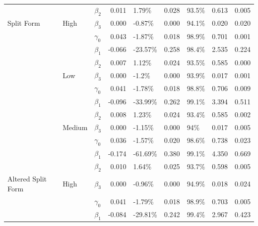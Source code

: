 \documentclass{svjour3}\usepackage[]{graphicx}\usepackage[]{color}
\newenvironment{knitrout}{}{} %
\begin{document}
\begin{knitrout}
\begin{table}[!h]
{\begin{tabular}[t]{l|l|l|r|l|r|l|r|r}
 &  & $\beta_2$ & 0.011 & 1.79\% & 0.028 & 93.5\% & 0.613 & 0.005\\

\multirow{-12}{*}{\raggedright\arraybackslash Split Form} & \multirow{-4}{*}{\raggedright\arraybackslash High} & $\beta_3$ & 0.000 & -0.87\% & 0.000 & 94.1\% & 0.020 & 0.020\\
\cline{1-9}
 &  & $\gamma_0$ & 0.043 & -1.87\% & 0.018 & 98.9\% & 0.701 & 0.001\\

 &  & $\beta_1$ & -0.066 & -23.57\% & 0.258 & 98.4\% & 2.535 & 0.224\\

 &  & $\beta_2$ & 0.007 & 1.12\% & 0.024 & 93.5\% & 0.585 & 0.000\\

 & \multirow{-4}{*}{\raggedright\arraybackslash Low} & $\beta_3$ & 0.000 & -1.2\% & 0.000 & 93.9\% & 0.017 & 0.001\\

 &  & $\gamma_0$ & 0.041 & -1.78\% & 0.018 & 98.8\% & 0.706 & 0.009\\

 &  & $\beta_1$ & -0.096 & -33.99\% & 0.262 & 99.1\% & 3.394 & 0.511\\

 &  & $\beta_2$ & 0.008 & 1.23\% & 0.024 & 93.4\% & 0.585 & 0.002\\

 & \multirow{-4}{*}{\raggedright\arraybackslash Medium} & $\beta_3$ & 0.000 & -1.15\% & 0.000 & 94\% & 0.017 & 0.005\\

 &  & $\gamma_0$ & 0.036 & -1.57\% & 0.020 & 98.6\% & 0.738 & 0.023\\

 &  & $\beta_1$ & -0.174 & -61.69\% & 0.380 & 99.1\% & 4.350 & 0.669\\

 &  & $\beta_2$ & 0.010 & 1.64\% & 0.025 & 93.7\% & 0.598 & 0.005\\

\multirow{-12}{*}{\raggedright\arraybackslash Altered Split Form} & \multirow{-4}{*}{\raggedright\arraybackslash High} & $\beta_3$ & 0.000 & -0.96\% & 0.000 & 94.9\% & 0.018 & 0.024\\
\cline{1-9}
 &  & $\gamma_0$ & 0.041 & -1.79\% & 0.018 & 98.9\% & 0.703 & 0.005\\

 &  & $\beta_1$ & -0.084 & -29.81\% & 0.242 & 99.4\% & 2.967 & 0.423\\


\end{tabular}}
\end{table}
\end{knitrout}
\end{document}
